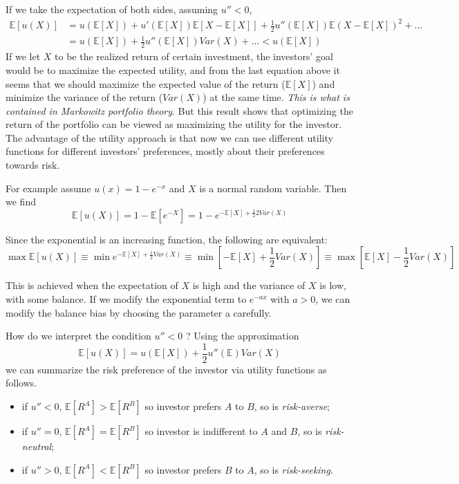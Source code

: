 If we take the expectation of both sides, assuming $u'' < 0$,
\begin{equation*}
  \begin{aligned}
  \mathbb{E}[u(X)] &= u(\mathbb{E}[X]) + u'(\mathbb{E}[X]) \mathbb{E}[X − \mathbb{E}[X]] + \frac{1}{2}u''(\mathbb{E}[X]) \mathbb{E}(X − \mathbb{E}[X])^2 + \ldots\\
  &= u (\mathbb{E}[X]) + \frac{1}{2}u'' (\mathbb{E}[X]) Var(X) + \ldots < u (\mathbb{E}[X])
  \end{aligned}
\end{equation*}
If we let $X$ to be the realized return of certain investment, the investors’ goal would be to maximize the expected utility, and from the last equation above it seems
that we should maximize the expected value of the return ($\mathbb{E}[X]$) and minimize the variance of the return ($Var(X)$) at the same time. \emph{This is what is contained in Markowitz portfolio theory}.
But this result shows that optimizing the return of the portfolio can be viewed as maximizing the utility for the investor. The
advantage of the utility approach is that now we can use different utility functions for different investors’ preferences, mostly about their preferences towards risk.

For example assume $u(x) = 1−e^{−x}$ and $X$ is a normal random variable. Then we find
\begin{equation*}
  \mathbb{E}[u(X)] = 1 − \mathbb{E}[e^{−X}] = 1 − e^{−\mathbb{E}[X]+ \frac{1}{2}2Var(X)}
\end{equation*}

Since the exponential is an increasing function, the following are equivalent:
\begin{equation*}
  \max \mathbb{E}[u(X)] \equiv \min e^{−\mathbb{E}[X]+ \frac{1}{2}Var(X)} \equiv \min\left[−\mathbb{E}[X] + \frac{1}{2}Var(X)\right] \equiv \max\left[\mathbb{E}[X] − \frac{1}{2}Var(X)\right]
\end{equation*}

This is achieved when the expectation of $X$ is high and the variance of $X$ is low, with some balance. If we modify the exponential term to $e^{−ax}$ with $a > 0$, we can
modify the balance bias by choosing the parameter a carefully.

How do we interpret the condition $u''<0$ ? Using the approximation
\begin{equation*}
  \mathbb{E}[u(X)] = u (\mathbb{E}[X]) + \frac{1}{2}u''(\mathbb{E})Var(X)
\end{equation*}
we can summarize the risk preference of the investor via utility functions as follows.
\begin{itemize}
\item if $u'' < 0$, $\mathbb{E}[R^A] > \mathbb{E}[R^B]$ so investor prefers $A$ to $B$, so is \emph{risk-averse};
\item if $u'' = 0$, $\mathbb{E}[R^A] = \mathbb{E}[R^B]$ so investor is indifferent to $A$ and $B$, so is \emph{risk-neutral};
\item if $u'' > 0$, $\mathbb{E}[R^A] < \mathbb{E}[R^B]$ so investor prefers $B$ to $A$, so is \emph{risk-seeking}.
\end{itemize}

